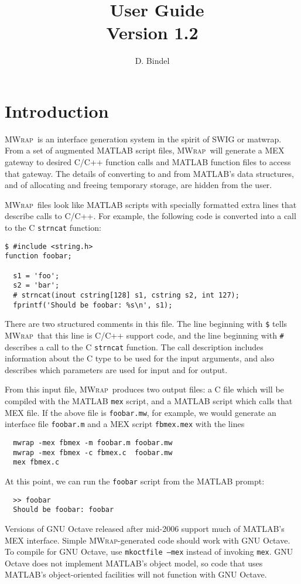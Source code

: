\documentclass[12pt]{article}
\title{\mwrap\ User Guide\\ Version 1.2}
\author{D. Bindel}
\newcommand{\mwrap}{\textsc{MWrap}}
\begin{document}
\maketitle

\section{Introduction}

\mwrap\ is an interface generation system in the spirit of SWIG or
matwrap.  From a set of augmented MATLAB script files, \mwrap\ will
generate a MEX gateway to desired C/C++ function calls and MATLAB
function files to access that gateway.  The details of converting to
and from MATLAB's data structures, and of allocating and freeing
temporary storage, are hidden from the user.

\mwrap\ files look like MATLAB scripts with specially formatted
extra lines that describe calls to C/C++.  For example, the following
code is converted into a call to the C {\tt strncat} function:
\begin{verbatim}
$ #include <string.h>
function foobar;

  s1 = 'foo';
  s2 = 'bar';
  # strncat(inout cstring[128] s1, cstring s2, int 127);
  fprintf('Should be foobar: %s\n', s1);
\end{verbatim}
There are two structured comments in this file.  The line
beginning with \verb|$| tells \mwrap\ that this line is C/C++
support code, and the line beginning with \verb|#| describes
a call to the C {\tt strncat} function.  The call description
includes information about the C type to be used for the input
arguments, and also describes which parameters are used for input
and for output.

From this input file, \mwrap\ produces two output files: a C file
which will be compiled with the MATLAB {\tt mex} script, and a MATLAB
script which calls that MEX file.  If the above file is {\tt foobar.mw},
for example, we would generate an interface file {\tt foobar.m} and a
MEX script {\tt fbmex.mex} with the lines
\begin{verbatim}
  mwrap -mex fbmex -m foobar.m foobar.mw
  mwrap -mex fbmex -c fbmex.c  foobar.mw
  mex fbmex.c
\end{verbatim}
At this point, we can run the {\tt foobar} script from the MATLAB prompt:
\begin{verbatim}
  >> foobar
  Should be foobar: foobar
\end{verbatim}

Versions of GNU Octave released after mid-2006 support much of
MATLAB's MEX interface.  Simple {\mwrap}-generated code should work
with GNU Octave.  To compile for GNU Octave, use \texttt{mkoctfile
  --mex} instead of invoking \texttt{mex}.  GNU Octave does not
implement MATLAB's object model, so code that uses MATLAB's
object-oriented facilities will not function with GNU Octave.
\end{document}
